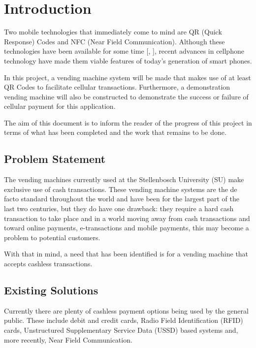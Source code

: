 \chapter{Introduction}



Two mobile technologies that immediately come to mind are QR (Quick Response) Codes and NFC
(Near Field Communication). Although these technologies have been available for some time
[\cite{website:denso-qrcode}, \cite{patent:nfc-patent}], recent advances in cellphone
technology have made them viable features of today's generation of smart phones.

In this project, a vending machine system will be made that makes use of at least QR Codes to
facilitate cellular transactions. Furthermore, a demonstration vending machine will also be
constructed to demonstrate the success or failure of cellular payment for this application.

The aim of this document is to inform the reader of the progress of this project in terms of
what has been completed and the work that remains to be done. 

\section{Problem Statement}

The vending machines currently used at the Stellenbosch University (SU) make exclusive use of
cash transactions. These vending machine systems are the de facto standard throughout the
world and have been for the largest part of the last two centuries, but they do have one
drawback: they require a hard cash transaction to take place and in a world moving away from
cash transactions and toward online payments, e-transactions and mobile payments, this may
become a problem to potential customers.

With that in mind, a need that has been identified is for a vending machine that accepts
cashless transactions.

\section{Existing Solutions}

Currently there are plenty of cashless payment options being used by the general public. These
include debit and credit cards, Radio Field Identification (RFID) cards, Unstructured
Supplementary Service Data (USSD) based systems and, more recently, Near Field Communication.


